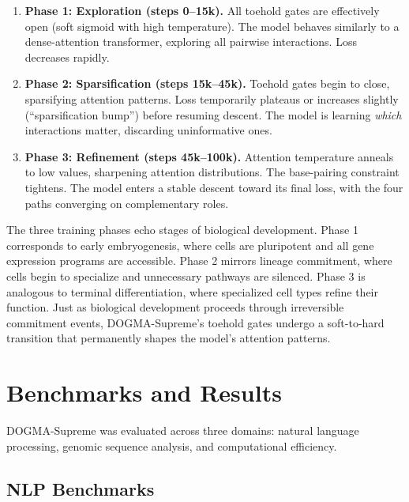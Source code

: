\begin{enumerate}[leftmargin=1.8em]
  \item \textbf{Phase 1: Exploration (steps 0--15k).} All toehold gates are effectively open (soft sigmoid with high temperature). The model behaves similarly to a dense-attention transformer, exploring all pairwise interactions. Loss decreases rapidly.

  \item \textbf{Phase 2: Sparsification (steps 15k--45k).} Toehold gates begin to close, sparsifying attention patterns. Loss temporarily plateaus or increases slightly (``sparsification bump'') before resuming descent. The model is learning \emph{which} interactions matter, discarding uninformative ones.

  \item \textbf{Phase 3: Refinement (steps 45k--100k).} Attention temperature anneals to low values, sharpening attention distributions. The base-pairing constraint tightens. The model enters a stable descent toward its final loss, with the four paths converging on complementary roles.
\end{enumerate}

\begin{bioinsight}
The three training phases echo stages of biological development. Phase 1 corresponds to early embryogenesis, where cells are pluripotent and all gene expression programs are accessible. Phase 2 mirrors lineage commitment, where cells begin to specialize and unnecessary pathways are silenced. Phase 3 is analogous to terminal differentiation, where specialized cell types refine their function. Just as biological development proceeds through irreversible commitment events, DOGMA-Supreme's toehold gates undergo a soft-to-hard transition that permanently shapes the model's attention patterns.
\end{bioinsight}

\section{Benchmarks and Results}
\label{sec:benchmarks}

DOGMA-Supreme was evaluated across three domains: natural language processing, genomic sequence analysis, and computational efficiency.

\subsection{NLP Benchmarks}

